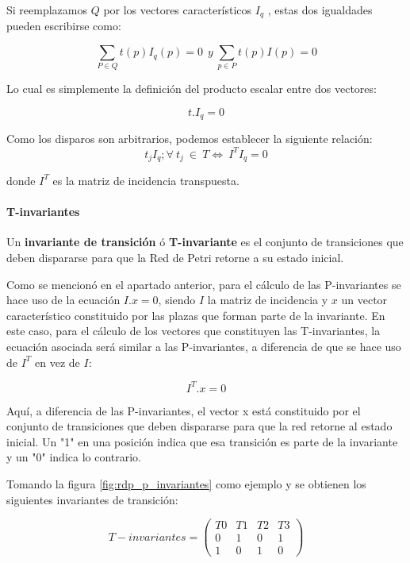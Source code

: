 Si reemplazamos $Q$ por los vectores característicos $I_q$ , estas dos igualdades pueden escribirse como:

\begin{equation}
    \sum_{P \in Q} t(p) I_q(p) = 0 \ \ y \  \sum_{p \in P} t(p)I(p) = 0
\end{equation}

\noindent Lo cual es simplemente la definición del producto escalar entre dos vectores:

\begin{equation}
    t.I_q = 0
\end{equation}

\noindent Como los disparos son arbitrarios, podemos establecer la siguiente relación:
\begin{equation}
    t_j I_q; \forall \ t_j \ \in \ T \Longleftrightarrow \ I^T I_q = 0
\end{equation}

\noindent donde $I^T$ es la matriz de incidencia transpuesta.

\paragraph{T-invariantes}
Un \textbf{invariante de transición} ó \textbf{T-invariante} es el conjunto de transiciones que deben dispararse para que la Red de Petri retorne a su estado inicial.

Como se mencionó en el apartado anterior, para el cálculo de las P-invariantes se hace uso de la ecuación $I . x = 0$, siendo $I$ la matriz de incidencia y $x$ un vector característico constituido por las plazas que forman parte de la invariante. En este caso, para el cálculo de los vectores que constituyen las T-invariantes, la ecuación asociada será similar a las P-invariantes, a diferencia de que se hace uso de $I^T$ en vez de $I$:

\begin{equation}
    I^T . x = 0
\end{equation}

Aquí, a diferencia de las P-invariantes, el vector x está constituido por el conjunto de transiciones que deben dispararse para que la red retorne al estado inicial. Un "1" en una posición indica que esa transición es parte de la invariante y un "0" indica lo contrario.

Tomando la figura \ref{fig:rdp_p_invariantes} como ejemplo y se obtienen los siguientes invariantes de transición:

\begin{equation}
    T-invariantes = 
    \begin{pmatrix}
         T0 & T1 & T2 & T3  \\
         0 & 1 & 0 & 1  \\
         1 & 0 & 1 & 0  
    \end{pmatrix}
\end{equation}

